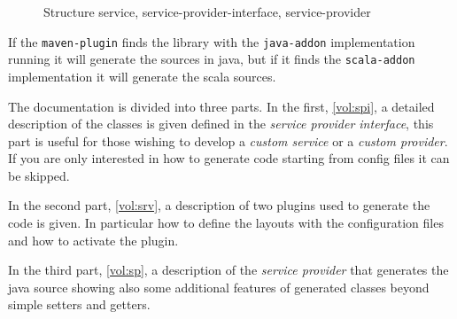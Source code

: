 \begin{figure}[!htb]
\centering
{}
\caption{Structure service, service-provider-interface, service-provider} 
\label{fig:spi}
\end{figure}

If the \verb!maven-plugin! finds the library with the \verb!java-addon! 
implementation running it will generate the sources in java, but if it finds 
the \verb!scala-addon! implementation it will generate the scala sources.

The documentation is divided into three parts. In the first, \ref{vol:spi}, a 
detailed description of the classes is given defined in the 
\textsl{service provider interface}, this part is useful for those wishing to 
develop a \textit{custom service} or a \textit{custom provider}. 
If you are only interested in how to generate code starting from config files 
it can be skipped.

In the second part, \ref{vol:srv}, a description of two plugins used to generate 
the code is given. In particular how to define the layouts with the 
configuration files and how to activate the plugin.

In the third part, \ref{vol:sp}, a description of the \textsl{service provider} 
that generates the java source showing also some additional features of 
generated classes beyond simple setters and getters.

%

\clearpage
